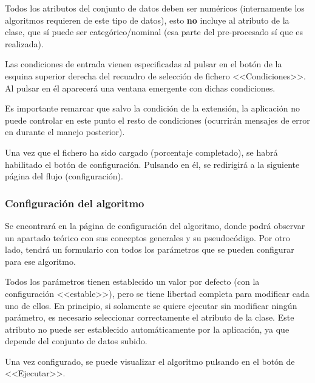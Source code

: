 \begin{tcolorbox}[colback=red!5!white,colframe=red!75!black,fontupper=\footnotesize,title=Requisito fundamental]
Todos los atributos del conjunto de datos deben ser numéricos (internamente los
algoritmos requieren de este tipo de datos), esto \textbf{no} incluye al
atributo de la clase, que sí puede ser categórico/nominal (esa parte del
pre-procesado sí que es realizada).
\end{tcolorbox}

Las condiciones de entrada vienen especificadas al pulsar en el botón de la
esquina superior derecha del recuadro de selección de fichero <<Condiciones>>.
Al pulsar en él aparecerá una ventana emergente con dichas condiciones.


Es importante remarcar que salvo la condición de la extensión, la aplicación no
puede controlar en este punto el resto de condiciones (ocurrirán mensajes de
error en durante el manejo posterior).

Una vez que el fichero ha sido cargado (porcentaje completado), se habrá
habilitado el botón de configuración. Pulsando en él, se redirigirá a la
siguiente página del flujo (configuración).

\subsubsection{Configuración del algoritmo}
\label{mu:configuracion}
Se encontrará en la página de configuración del algoritmo, donde podrá observar
un apartado teórico con sus conceptos generales y su pseudocódigo. Por otro
lado, tendrá un formulario con todos los parámetros que se pueden configurar
para ese algoritmo.


Todos los parámetros tienen establecido un valor por defecto (con la
configuración <<estable>>), pero se tiene libertad completa para modificar cada
uno de ellos. En principio, si solamente se quiere ejecutar sin modificar ningún
parámetro, es necesario seleccionar correctamente el atributo de la clase.
Este atributo no puede ser establecido automáticamente por la aplicación, ya que
depende del conjunto de datos subido. 

Una vez configurado, se puede visualizar el algoritmo pulsando en el botón de
<<Ejecutar>>.

